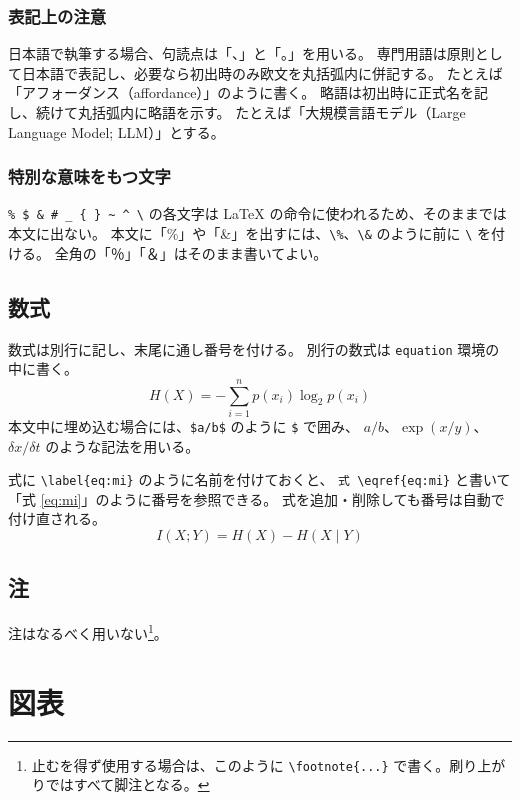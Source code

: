 \documentclass[paper]{bunkajoho}
\begin{document}
\subsubsection{表記上の注意}

日本語で執筆する場合、句読点は「、」と「。」を用いる。
専門用語は原則として日本語で表記し、必要なら初出時のみ欧文を丸括弧内に併記する。
たとえば「アフォーダンス（affordance）」のように書く。
略語は初出時に正式名を記し、続けて丸括弧内に略語を示す。
たとえば「大規模言語モデル（Large Language Model; LLM）」とする。

\subsubsection{特別な意味をもつ文字}

\verb|% $ & # _ { } ~ ^ \| の各文字は LaTeX の命令に使われるため、そのままでは本文に出ない。
本文に「\%」や「\&」を出すには、\verb|\%|、\verb|\&| のように前に \verb|\| を付ける。
全角の「％」「＆」はそのまま書いてよい。

\subsection{数式}

数式は別行に記し、末尾に通し番号を付ける。
別行の数式は \verb|equation| 環境の中に書く。
\begin{equation}
  H(X) = -\sum_{i=1}^{n} p(x_i) \log_2 p(x_i)
  \label{eq:entropy}
\end{equation}
本文中に埋め込む場合には、\verb|$a/b$| のように \verb|$| で囲み、
$a/b$、$\exp(x/y)$、$\delta x/\delta t$ のような記法を用いる。

式に \verb|\label{eq:mi}| のように名前を付けておくと、
\verb|式 \eqref{eq:mi}| と書いて「式 \eqref{eq:mi}」のように番号を参照できる。
式を追加・削除しても番号は自動で付け直される。
\begin{equation}
  I(X;Y) = H(X) - H(X \mid Y)
  \label{eq:mi}
\end{equation}

\subsection{注}

注はなるべく用いない\footnote{止むを得ず使用する場合は、このように \texttt{\textbackslash footnote\{...\}} で書く。刷り上がりではすべて脚注となる。}。

\section{図表}
\end{document}
